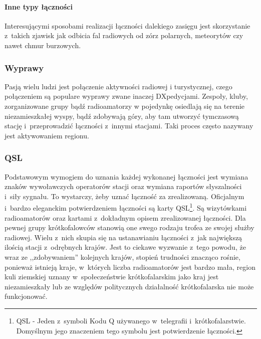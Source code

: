 \documentclass[]{mgr}
\begin{document}
                    \paragraph{Inne typy łączności}
                    Interesującymi sposobami realizacji łączności dalekiego zasięgu jest skorzystanie z~takich zjawisk jak odbicia fal radiowych od zórz polarnych, meteorytów czy nawet chmur burzowych.

                \subsubsection{Wyprawy}
                Pasją wielu ludzi jest połączenie aktywności radiowej i turystycznej, czego połączeniem są populare wyprawy zwane inaczej DXpedycjami. Zespoły, kluby, zorganizowane grupy bądź radioamatorzy w pojedynkę osiedlają się na terenie niezamieszkałej wyspy, bądź zdobywają góry,  aby tam utworzyć tymczasową stację i~przeprowadzić łączności z~innymi stacjami. Taki proces często nazywany jest aktywowaniem regionu.

                \subsubsection{QSL}
                Podstawowym wymogiem do uznania każdej wykonanej łączności jest wymiana znaków wywoławczych operatorów stacji oraz wymiana raportów słyszalności i~siły sygnału. To wystarczy, żeby uznać łączność za zrealizowaną. Oficjalnym i~bardzo eleganckim potwierdzeniem łączności są karty QSL\footnote{QSL - Jeden z~symboli Kodu Q używanego w~telegrafii i~krótkofalarstwie. Domyślnym jego znaczeniem tego symbolu jest potwierdzenie łączności.}. Są wizytówkami radioamatorów oraz kartami z~dokładnym opisem zrealizowanej łączności. Dla pewnej grupy krótkofalowców stanowią one swego rodzaju trofea ze swojej służby radiowej. Wielu z~nich skupia się na ustanawianiu łączności z~jak największą ilością stacji z~odrębnych krajów. Jest to ciekawe wyzwanie z~tego powodu, że wraz ze ,,zdobywaniem'' kolejnych krajów, stopień trudności znacząco rośnie, ponieważ istnieją kraje, w~których liczba radioamatorów jest bardzo mała, region kuli ziemskiej uznany w~społeczeństwie krótkofalarskim jako kraj jest niezamieszkały lub ze względów politycznych działalność krótkofalarska nie może funkcjonować.
\end{document}
